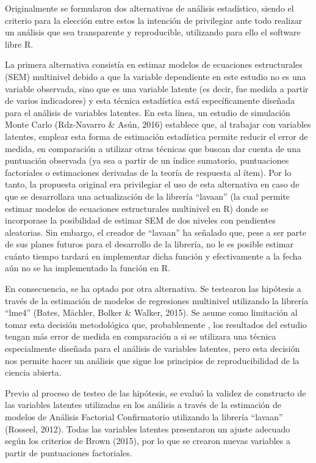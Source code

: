 \documentclass[12pt,twoside]{templates/facsothesis}
\begin{document}
Originalmente se formularon dos alternativas de análisis estadístico, siendo el criterio para la elección entre estos la intención de privilegiar ante todo realizar un análisis que sea transparente y reproducible, utilizando para ello el software libre R.

La primera alternativa consistía en estimar modelos de ecuaciones estructurales (SEM) multinivel debido a que la variable dependiente en este estudio no es una variable observada, sino que es una variable latente (es decir, fue medida a partir de varios indicadores) y esta técnica estadística está específicamente diseñada para el análisis de variables latentes. En esta línea, un estudio de simulación Monte Carlo (Rdz-Navarro \& Asún, 2016) establece que, al trabajar con variables latentes, emplear esta forma de estimación estadística permite reducir el error de medida, en comparación a utilizar otras técnicas que buscan dar cuenta de una puntuación observada (ya sea a partir de un índice sumatorio, puntuaciones factoriales o estimaciones derivadas de la teoría de respuesta al ítem). Por lo tanto, la propuesta original era privilegiar el uso de esta alternativa en caso de que se desarrollara una actualización de la librería ``lavaan'' (la cual permite estimar modelos de ecuaciones estructurales multinivel en R) donde se incorporase la posibilidad de estimar SEM de dos niveles con pendientes aleatorias. Sin embargo, el creador de ``lavaan'' ha señalado que, pese a ser parte de sus planes futuros para el desarrollo de la librería, no le es posible estimar cuánto tiempo tardará en implementar dicha función y efectivamente a la fecha aún no se ha implementado la función en R.

En consecuencia, se ha optado por otra alternativa. Se testearon las hipótesis a través de la estimación de modelos de regresiones multinivel utilizando la librería ``lme4'' (Bates, Mächler, Bolker \& Walker, 2015). Se asume como limitación al tomar esta decisión metodológica que, probablemente , los resultados del estudio tengan más error de medida en comparación a si se utilizara una técnica especialmente diseñada para el análisis de variables latentes, pero esta decisión nos permite hacer un análisis que sigue los principios de reproducibilidad de la ciencia abierta.

Previo al proceso de testeo de las hipótesis, se evaluó la validez de constructo de las variables latentes utilizadas en los análisis a través de la estimación de modelos de Análisis Factorial Confirmatorio utilizando la librería ``lavaan'' (Rosseel, 2012). Todas las variables latentes presentaron un ajuste adecuado según los criterios de Brown (2015), por lo que se crearon nuevas variables a partir de puntuaciones factoriales.
\end{document}
